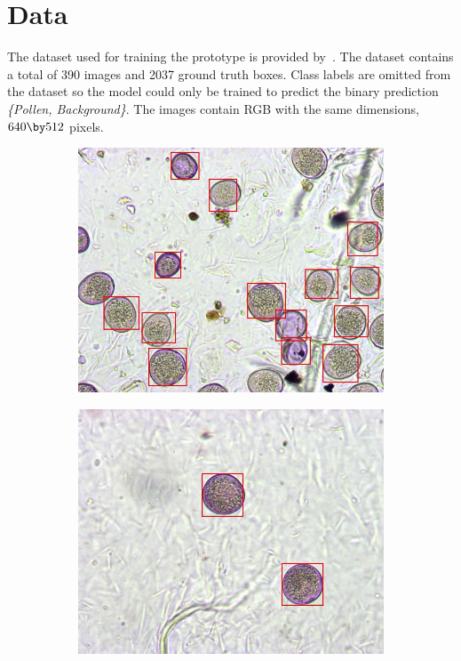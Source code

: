 \section*{Data}
The dataset used for training the prototype is provided by~\cite{gallardo_caballero_precise_2019}.
The dataset contains a total of 390 images and 2037 ground truth boxes.
Class labels are omitted from the dataset so the model could only be trained to predict the binary prediction \textit{\{Pollen, Background\}}.
The images contain RGB with the same dimensions, \( 640\by 512 \) pixels.

\begin{figure}[htbp]
  \centering
  \begin{subfigure}[b]{0.4\textwidth}
    \centering
    \includegraphics[width=\textwidth]{figs/ex_04}
    \vspace*{0.02\textwidth}
  \end{subfigure}%
  \hspace*{0.04\textwidth}
  \begin{subfigure}[b]{0.4\textwidth}
    \centering
    \includegraphics[width=\textwidth]{figs/ex_03}
    \vspace*{0.02\textwidth}
  \end{subfigure}


\end{figure}
